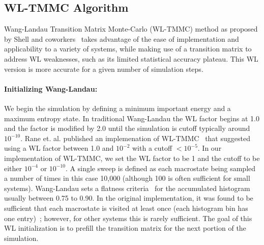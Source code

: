 \documentclass[letterpaper,twocolumn,amsmath,amssymb,pre,aps,10pt]{revtex4-1}
\begin{document}
\subsection{WL-TMMC Algorithm}

Wang-Landau Transition Matrix Monte-Carlo (WL-TMMC) method as proposed
by Shell and coworkers~\cite{shell2003improved,shell2004flat} takes
advantage of the ease of implementation and applicability to a variety
of systems, while making use of a transition matrix to address WL
weaknesses, such as its limited statistical accuracy plateau.  
This WL version is more accurate for a given number of simulation steps.

\paragraph{Initializing Wang-Landau:} We begin the simulation by
defining a minimum important energy and a maximum entropy state. In
traditional Wang-Landau the WL factor begins at 1.0 and the factor is
modified by 2.0 until the simulation is cutoff typically around
$10^{-10}$.  Rane et. al. published an implemenation of
WL-TMMC~\cite{rane2013monte} that suggested using a WL factor between
1.0 and $10^{-2}$ with a cutoff $<10^{-5}$. In our implementation of
WL-TMMC, we set the WL factor to be 1 and the cutoff to be either
$10^{-4}$ or $10^{-10}$. A single sweep is defined as each macrostate
being sampled a number of times in this case 10,000 (although 100 is
often sufficient for small systems). Wang-Landau sets a flatness
criteria~\cite{wang2001determining, wang2001efficient,
hatch2015computational, mahynski2017predicting} for the accumulated
histogram usually between 0.75 to 0.90.  In the original
implementation, it was found to be sufficient that each macrostate is
visited at least once (each histogram bin has one
entry)~\cite{shell2003improved}; however, for other systems this is
rarely sufficient.  The goal of this WL initialization is to prefill
the transition matrix for the next portion of the simulation.
\end{document}
